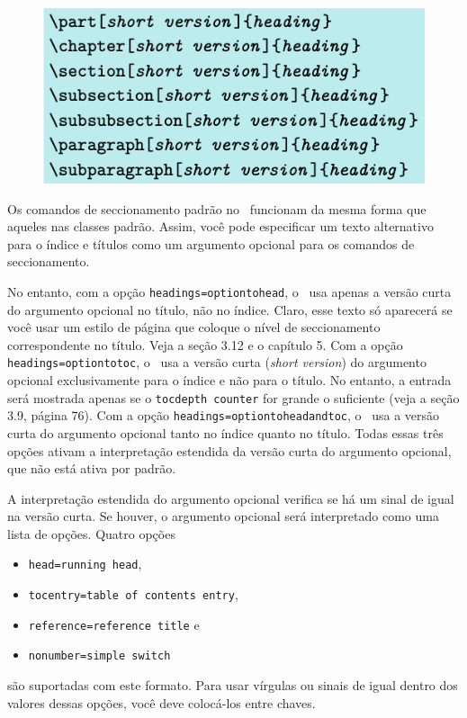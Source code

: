 \begin{figure}
    \centering
    \includegraphics[width=0.65\linewidth]{imagens/imagem18.png}
    \label{fig:img18}
\end{figure}

Os comandos de seccionamento padrão no \KOMAScript\ funcionam da mesma forma que aqueles nas classes padrão. Assim, você pode especificar um texto alternativo para o índice e títulos como um argumento opcional para os comandos de seccionamento.

No entanto, com a opção \texttt{headings=optiontohead}, o \KOMAScript\ usa apenas a versão curta do argumento opcional no título, não no índice. Claro, esse texto só aparecerá se você usar um estilo de página que coloque o nível de seccionamento correspondente no título. Veja a seção 3.12 e o capítulo 5. Com a opção \texttt{headings=optiontotoc}, o \KOMAScript\ usa a versão curta (\textit{short version}) do argumento opcional exclusivamente para o índice e não para o título. No entanto, a entrada será mostrada apenas se o \texttt{tocdepth counter} for grande o suficiente (veja a seção 3.9, página 76). Com a opção \texttt{headings=optiontoheadandtoc}, o \KOMAScript\ usa a versão curta do argumento opcional tanto no índice quanto no título. Todas essas três opções ativam a interpretação estendida da versão curta do argumento opcional, que não está ativa por padrão.

A interpretação estendida do argumento opcional verifica se há um sinal de igual na versão curta. Se houver, o argumento opcional será interpretado como uma lista de opções. Quatro opções
\begin{itemize}
    \item \texttt{head=running head},
    \item \texttt{tocentry=table of contents entry},
    \item \texttt{reference=reference title} e 
    \item \texttt{nonumber=simple switch}
\end{itemize}

são suportadas com este formato. Para usar vírgulas ou sinais de igual dentro dos valores dessas opções, você deve colocá-los entre chaves.

